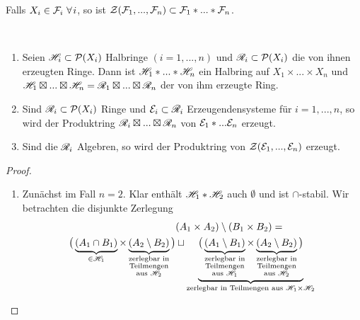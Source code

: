 Falls $X_i \in \FF_i \ \forall i$, so ist $\mathcal{Z}(\mathcal{F}_1,...,\mathcal{F}_n) \subset \mathcal{F}_1 \ast ... \ast \mathcal{F}_n$.%
\begin{proposition}
\begin{mdframed} \
\begin{enumerate}[(\roman*),topsep=5pt]
	\item Seien $\mathscr{H}_i \subset \mathcal{P}(X_i)$ Halbringe $(i=1,...,n)$ und $\mathscr{R}_i \subset \mathcal{P}(X_i)$ die von ihnen erzeugten Ringe. Dann ist $\mathscr{H}_1 \ast ... \ast \mathscr{H}_n$ ein Halbring auf $X_1 \times ... \times X_n$ und $\mathscr{H}_1 \boxtimes ... \boxtimes \mathscr{H}_n =\mathscr{R}_1 \boxtimes ... \boxtimes \mathscr{R}_n$ der von ihm erzeugte Ring.
	\item Sind $\mathscr{R}_i \subset \mathcal{P}(X_i)$ Ringe und $\mathcal{E}_i \subset \mathscr{R}_i$ Erzeugendensysteme für $i=1,...,n$, so wird der Produktring $\mathscr{R}_i \boxtimes ... \boxtimes \mathscr{R}_n$ von $\mathcal{E}_1 \ast ... \mathcal{E}_n$ erzeugt.
	\item Sind die $\mathscr{R}_i$ Algebren, so wird der Produktring von $\mathcal{Z}(\mathcal{E}_1,...,\mathcal{E}_n)$ erzeugt.
\end{enumerate}
\end{mdframed}
\label{propC}
\begin{proof} \
\begin{enumerate}[(\roman*),topsep=5pt]
	\item Zunächst im Fall $n=2$. Klar enthält $\mathscr{H}_1 \ast \mathscr{H}_2$ auch $\emptyset$ und ist $\cap$-stabil. Wir betrachten die disjunkte Zerlegung
	\begin{equation*}
	\begin{split}
		&(A_1 \times A_2) \setminus (B_1 \times B_2) =\\
	 \big( \underbrace{(A_1 \cap B_1)}_{\in \HH_1} \times \underbrace{(A_2 \setminus B_2)}_{\substack{\text{zerlegbar in} \\ \text{Teilmengen}\\ \text{aus }\HH_2}} \big) & \sqcup \underbrace{\big( \underbrace{(A_1 \setminus B_1)}_{\substack{\text{zerlegbar in} \\ \text{Teilmengen}\\ \text{aus }\HH_1}} \times \underbrace{(A_2 \setminus B_2)}_{\substack{\text{zerlegbar in} \\ \text{Teilmengen}\\ \text{aus }\HH_2}} \big)}_{\text{zerlegbar in Teilmengen aus } \HH_1 \times \HH_2}

\end{split}
\end{equation*}
\end{enumerate}
\end{proof}
\end{proposition}
